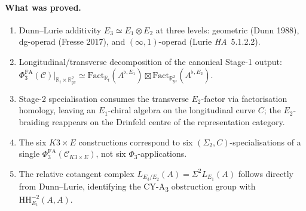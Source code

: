 \documentclass[11pt]{article}
\newcommand{\Eone}{E_{1}}
\newcommand{\Etwo}{E_{2}}
\newcommand{\Ethree}{E_{3}}
\newcommand{\R}{\mathbb{R}}
\newcommand{\HH}{\mathrm{HH}}
\newcommand{\PhiFA}{\Phi^{\mathrm{FA}}}
\newcommand{\cC}{\mathcal{C}}
\begin{document}
\paragraph{What was proved.}
\begin{enumerate}[label=(\roman*), leftmargin=*]
  \item Dunn--Lurie additivity $\Ethree \simeq \Eone \otimes \Etwo$ at
    three levels: geometric (Dunn 1988), dg-operad (Fresse 2017), and
    $(\infty, 1)$-operad (Lurie \emph{HA}~5.1.2.2).
  \item Longitudinal/transverse decomposition of the canonical Stage-1
    output: $\PhiFA_{3}(\cC)|_{\R_{t} \times \R^{2}_{yz}} \simeq
    \mathrm{Fact}_{\R_{t}}(A^{\flat, \Eone}) \boxtimes
    \mathrm{Fact}_{\R^{2}_{yz}}(A^{\flat, \Etwo})$.
  \item Stage-2 specialisation consumes the transverse $\Etwo$-factor
    via factorisation homology, leaving an $\Eone$-chiral algebra on
    the longitudinal curve $C$; the $\Etwo$-braiding reappears on the
    Drinfeld centre of the representation category.
  \item The six $K3 \times E$ constructions correspond to six
    $(\Sigma_{2}, C)$-specialisations of a single
    $\PhiFA_{3}(\cC_{K3 \times E})$, not six $\Phi_{3}$-applications.
  \item The relative cotangent complex $L_{\Ethree/\Etwo}(A) = \Sigma^{2}
    L_{\Eone}(A)$ follows directly from Dunn--Lurie, identifying the
    CY-A\textsubscript{3} obstruction group with $\HH^{-2}_{\Eone}(A, A)$.
\end{enumerate}
\end{document}
